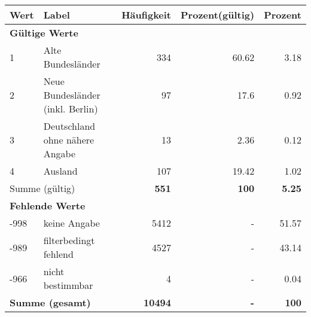      \begin{longtable}{lXrrr}
     \toprule
     \textbf{Wert} & \textbf{Label} & \textbf{Häufigkeit} & \textbf{Prozent(gültig)} & \textbf{Prozent} \\
     \endhead
     \midrule
     \multicolumn{5}{l}{\textbf{Gültige Werte}}\\

     1 &
     \multicolumn{1}{X}{ Alte Bundesländer   } &


       \num{334} &
       \num[round-mode=places,round-precision=2]{60,62} &
         \num[round-mode=places,round-precision=2]{3,18} \\

     2 &
     \multicolumn{1}{X}{ Neue Bundesländer (inkl. Berlin)   } &


       \num{97} &
       \num[round-mode=places,round-precision=2]{17,6} &
         \num[round-mode=places,round-precision=2]{0,92} \\

     3 &
     \multicolumn{1}{X}{ Deutschland ohne nähere Angabe   } &


       \num{13} &
       \num[round-mode=places,round-precision=2]{2,36} &
         \num[round-mode=places,round-precision=2]{0,12} \\

     4 &
     \multicolumn{1}{X}{ Ausland   } &


       \num{107} &
       \num[round-mode=places,round-precision=2]{19,42} &
         \num[round-mode=places,round-precision=2]{1,02} \\
     \midrule
     \multicolumn{2}{l}{Summe (gültig)} &
       \textbf{\num{551}} &
     \textbf{100} &
       \textbf{\num[round-mode=places,round-precision=2]{5,25}} \\
     \multicolumn{5}{l}{\textbf{Fehlende Werte}}\\
       -998 &
       keine Angabe &
         \num{5412} &
        - &
         \num[round-mode=places,round-precision=2]{51,57} \\
       -989 &
       filterbedingt fehlend &
         \num{4527} &
        - &
         \num[round-mode=places,round-precision=2]{43,14} \\
       -966 &
       nicht bestimmbar &
         \num{4} &
        - &
         \num[round-mode=places,round-precision=2]{0,04} \\
     \midrule
     \multicolumn{2}{l}{\textbf{Summe (gesamt)}} &
          \textbf{\num{10494}} &
        \textbf{-} &
        \textbf{100} \\
     \bottomrule
     \end{longtable}
     
